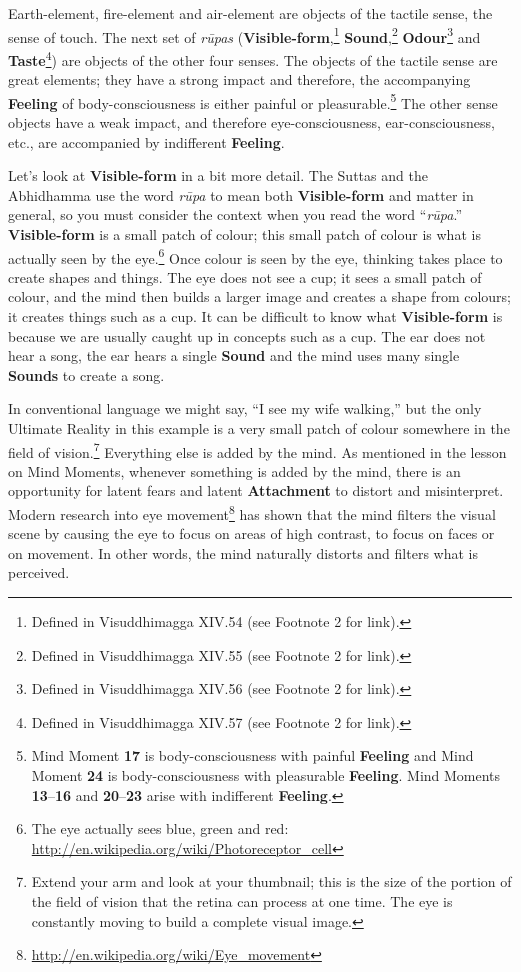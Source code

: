 Earth-element, fire-element and air-element are objects of the tactile sense, the sense of touch. The next set of \textit{rūpas} (\textbf{Visible-form},\footnote{Defined in Visuddhimagga XIV.54 (see Footnote 2 for link).} \textbf{Sound},\footnote{Defined in Visuddhimagga XIV.55 (see Footnote 2 for link).} \textbf{Odour}\footnote{Defined in Visuddhimagga XIV.56 (see Footnote 2 for link).} and \textbf{Taste}\footnote{Defined in Visuddhimagga XIV.57 (see Footnote 2 for link).}) are objects of the other four senses. The objects of the tactile sense are great elements; they have a strong impact and therefore, the accompanying \textbf{Feeling} of body-consciousness is either painful or pleasurable.\footnote{Mind Moment \textbf{17} is body-consciousness with painful \textbf{Feeling} and Mind Moment \textbf{24} is body-consciousness with pleasurable \textbf{Feeling}. Mind Moments \textbf{13}--\textbf{16} and \textbf{20}--\textbf{23} arise with indifferent \textbf{Feeling}.} The other sense objects have a weak impact, and therefore eye-consciousness, ear-consciousness, etc., are accompanied by indifferent \textbf{Feeling}.

Let’s look at \textbf{Visible-form} in a bit more detail. The Suttas and the Abhidhamma use the word \textit{rūpa} to mean both \textbf{Visible-form} and matter in general, so you must consider the context when you read the word “\textit{rūpa}.” \textbf{Visible-form} is a small patch of colour; this small patch of colour is what is actually seen by the eye.\footnote{The eye actually sees blue, green and red: \url{http://en.wikipedia.org/wiki/Photoreceptor_cell}} Once colour is seen by the eye, thinking takes place to create shapes and things. The eye does not see a cup; it sees a small patch of colour, and the mind then builds a larger image and creates a shape from colours; it creates things such as a cup. It can be difficult to know what \textbf{Visible-form} is because we are usually caught up in concepts such as a cup. The ear does not hear a song, the ear hears a single \textbf{Sound} and the mind uses many single \textbf{Sounds} to create a song.

\pagebreak

In conventional language we might say, “I see my wife walking,” but the only Ultimate Reality in this example is a very small patch of colour somewhere in the field of vision.\footnote{Extend your arm and look at your thumbnail; this is the size of the portion of the field of vision that the retina can process at one time. The eye is constantly moving to build a complete visual image.} Everything else is added by the mind. As mentioned in the lesson on Mind Moments, whenever something is added by the mind, there is an opportunity for latent fears and latent \textbf{Attachment} to distort and misinterpret. Modern research into eye movement\footnote{\url{http://en.wikipedia.org/wiki/Eye_movement}} has shown that the mind filters the visual scene by causing the eye to focus on areas of high contrast, to focus on faces or on movement. In other words, the mind naturally distorts and filters what is perceived.

